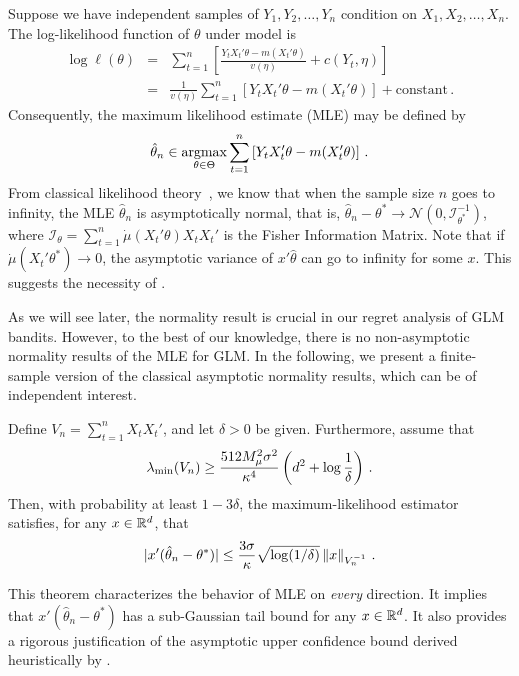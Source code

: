 Suppose we have independent samples of $Y_1, Y_2, \ldots, Y_n$ condition on $X_1,X_2,\ldots,X_n$. The log-likelihood function of $\theta$ under model  is
\begin{eqnarray*}
\log \ell(\theta) &=& \sum_{t=1}^n \left[\frac{Y_t X_t'\theta - m(X_t'\theta)}{v(\eta)} + c(Y_t,\eta)\right] \\
&=&
\frac{1}{v(\eta)} \sum_{t=1}^{n} \left[ Y_t X_t'\theta - m(X_t'\theta) \right] + \mathrm{constant}\,.
\end{eqnarray*}
Consequently, the maximum likelihood estimate (MLE) may be defined by
\[
\hat{\theta}_n \in \mathop{\rm argmax}_{\theta\in\Theta} \sum_{t=1}^{n} \left[ Y_t X_t'\theta - m(X_t'\theta) \right]\,.
\]
From classical likelihood theory~\cite{lehmann1998theory}, we know that when the sample size $n$ goes to infinity, the MLE $\hat{\theta}_n$ is asymptotically normal, that is,
$\hat{\theta}_n - \theta^* \to \mathcal{N}(0, \mathcal{I}^{-1}_{\theta^*})$, where $\mathcal{I}_\theta= \sum_{t=1}^{n} \dot{\mu}(X_t'\theta)X_tX_t'$ is the Fisher Information Matrix. Note that if $\dot{\mu}(X_t'\theta^*) \to 0$, the asymptotic variance of $x'\hat{\theta}$ can go to infinity for some $x$. This suggests the necessity of .

As we will see later, the normality result is crucial in our regret analysis of GLM bandits. However, to the best of our knowledge, there is no non-asymptotic normality results of the MLE for GLM. In the following, we present a finite-sample version of the classical asymptotic normality results, which can be of independent interest.
 
\begin{theorem} \label{thm:glm_ucb}
Define $V_n = \sum_{t=1}^{n} X_t X_t'$, and let $\delta>0$ be given.   Furthermore, assume
that
\begin{equation}
\lambda_{\min}(V_n) \ge  \frac{512 M_\mu^2 \sigma^2}{\kappa^4} \left(d^2 + \log\frac{1}{\delta}\right)\,.
\label{eq:lmin1}
\end{equation} 
Then, with probability at least $1-3\delta$,  the maximum-likelihood estimator satisfies, for any $x \in \mathbb{R}^d$, that
\begin{equation} \label{eq:normality}
|x'(\hat{\theta}_n-\theta^*)| \le \frac{3\sigma}{\kappa} \sqrt{\log(1/\delta)} \left\|x\right\|_{V_n^{-1}}\,.
\end{equation}
\end{theorem}
This theorem characterizes the behavior of MLE on \emph{every} direction. It implies that $x'(\hat{\theta}_n-\theta^*)$ has a sub-Gaussian tail bound for any $x \in \mathbb{R}^d$. It also provides a rigorous justification of the asymptotic upper confidence bound derived heuristically by \citet[Section~4.2]{filippi2010parametric}.

